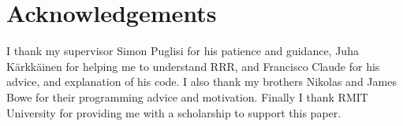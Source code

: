 \section{Acknowledgements}

I thank my supervisor Simon Puglisi for his patience and guidance,
Juha K\"{a}rkk\"{a}inen for helping me to understand RRR, and
Francisco Claude for his advice, and explanation of his
code. I also thank my brothers Nikolas and James Bowe for their
programming advice and motivation. Finally I thank RMIT University
for providing me with a scholarship to support this paper.
